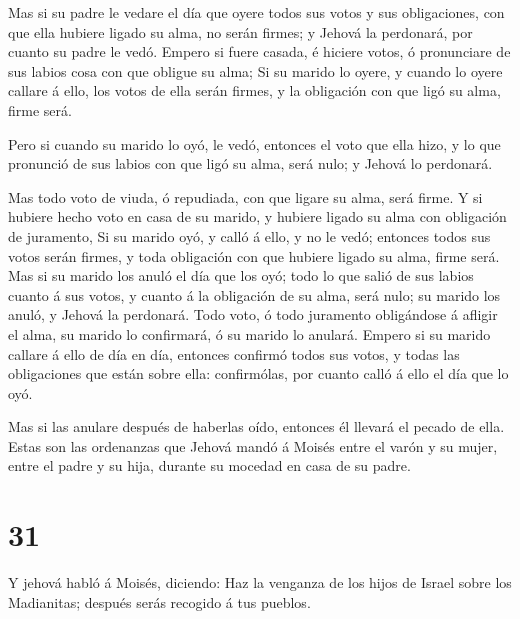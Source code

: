  Mas si su padre le vedare el día que oyere todos sus votos
y sus obligaciones, con que ella hubiere ligado su alma, no serán
firmes; y Jehová la perdonará, por cuanto su padre le vedó. 
Empero si fuere casada, é hiciere votos, ó pronunciare de sus labios
cosa con que obligue su alma;  Si su marido lo oyere, y
cuando lo oyere callare á ello, los votos de ella serán firmes, y la
obligación con que ligó su alma, firme será.

 Pero si cuando su marido lo oyó, le vedó, entonces el voto
que ella hizo, y lo que pronunció de sus labios con que ligó su alma,
será nulo; y Jehová lo perdonará.

 Mas todo voto de viuda, ó repudiada, con que ligare su
alma, será firme.  Y si hubiere hecho voto en casa de su
marido, y hubiere ligado su alma con obligación de juramento,
 Si su marido oyó, y calló á ello, y no le vedó; entonces
todos sus votos serán firmes, y toda obligación con que hubiere ligado
su alma, firme será.  Mas si su marido los anuló el día que
los oyó; todo lo que salió de sus labios cuanto á sus votos, y cuanto á
la obligación de su alma, será nulo; su marido los anuló, y Jehová la
perdonará.  Todo voto, ó todo juramento obligándose á
afligir el alma, su marido lo confirmará, ó su marido lo anulará.
 Empero si su marido callare á ello de día en día, entonces
confirmó todos sus votos, y todas las obligaciones que están sobre ella:
confirmólas, por cuanto calló á ello el día que lo oyó.

 Mas si las anulare después de haberlas oído, entonces él
llevará el pecado de ella. Estas son las ordenanzas que Jehová mandó á
Moisés entre el varón y su mujer, entre el padre y su hija, durante su
mocedad en casa de su padre.

\hypertarget{section-30}{%
\section{31}\label{section-30}}

 Y jehová habló á Moisés, diciendo:  Haz la
venganza de los hijos de Israel sobre los Madianitas; después serás
recogido á tus pueblos.

